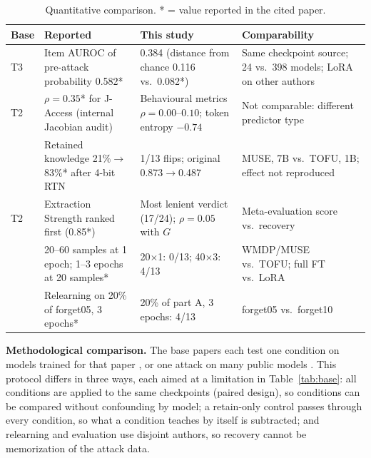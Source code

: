 \documentclass[conference]{IEEEtran}
\begin{document}
\begin{table}[t]
\caption{Quantitative comparison. * = value reported in the cited paper.}
\label{tab:quant}
\centering
\scriptsize
\setlength{\tabcolsep}{2.2pt}
\begin{tabular}{@{}L{1.1cm}L{2.25cm}L{2.25cm}L{2.1cm}@{}}
\toprule
Base & Reported & This study & Comparability \\
\midrule
\cite{song2026measure} T3 & Item AUROC of pre-attack probability 0.582* & 0.384 (distance from chance 0.116 vs.\ 0.082*) & Same checkpoint source; 24 vs.\ 398 models; LoRA on other authors \\
\cite{song2026measure} T2 & $\rho=0.35$* for J-Access (internal Jacobian audit) & Behavioural metrics $\rho=0.00$--$0.10$; token entropy $-0.74$ & Not comparable: different predictor type \\
\cite{zhang2025quant} & Retained knowledge 21\%$\to$83\%* after 4-bit RTN & 1/13 flips; original 0.873$\to$0.487 & MUSE, 7B vs.\ TOFU, 1B; effect not reproduced \\
\cite{dorna2025openunlearning} T2 & Extraction Strength ranked first (0.85*) & Most lenient verdict (17/24); $\rho=0.05$ with $G$ & Meta-evaluation score vs.\ recovery \\
\cite{fan2025sam} & 20--60 samples at 1 epoch; 1--3 epochs at 20 samples* & 20$\times$1: 0/13; 40$\times$3: 4/13 & WMDP/MUSE vs.\ TOFU; full FT vs.\ LoRA \\
\cite{fan2025simnpo} & Relearning on 20\% of forget05, 3 epochs* & 20\% of part A, 3 epochs: 4/13 & forget05 vs.\ forget10 \\
\bottomrule
\end{tabular}
\end{table}

\textbf{Methodological comparison.} The base papers each test one condition on models trained for that paper \cite{zhang2025quant,fan2025sam,fan2025simnpo,jeung2025seps}, or one attack on many public models \cite{song2026measure}. This protocol differs in three ways, each aimed at a limitation in Table~\ref{tab:base}: all conditions are applied to the same checkpoints (paired design), so conditions can be compared without confounding by model; a retain-only control passes through every condition, so what a condition teaches by itself is subtracted; and relearning and evaluation use disjoint authors, so recovery cannot be memorization of the attack data.
\end{document}
